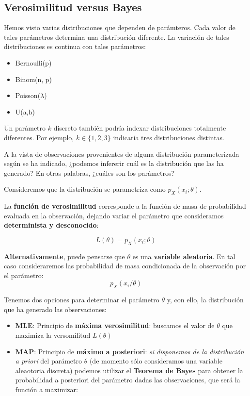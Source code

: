 \documentclass[11pt]{article}
\providecommand{\tightlist}{%
      \setlength{\itemsep}{0pt}\setlength{\parskip}{0pt}}
\begin{document}
    \hypertarget{verosimilitud-versus-bayes}{%
\subsection*{Verosimilitud versus
Bayes}\label{verosimilitud-versus-bayes}}

Hemos visto varias distribuciones que dependen de parámteros. Cada valor
de tales parámetros determina una distribución diferente. La variación
de tales distribuciones es continua con tales parámetros:

\begin{itemize}
\tightlist
\item
  Bernoulli(p)
\item
  Binom(n, p)
\item
  Poisson(\(\lambda\))
\item
  U(a,b)
\end{itemize}

Un parámetro \(k\) discreto también podría indexar distribuciones
totalmente diferentes. Por ejemplo, \(k \in \{1,2,3\}\) indicaría tres
distribuciones distintas.

    A la vista de observaciones provenientes de alguna distribución
parameterizada según se ha indicado, ¿podemos infererir cuál es la
distribución que las ha generado? En otras palabras, ¿cuáles son los
parámetros?

Consideremos que la distribución se parametriza como
\(p_X(x_i; \theta)\).

La \textbf{función de verosimilitud} corresponde a la función de masa de
probabilidad evaluada en la observación, dejando variar el parámetro que
consideramos \textbf{determinista y desconocido}:

\[L(\theta) = p_X(x_i; \theta)\]

\textbf{Alternativamente}, puede pensarse que \(\theta\) es una
\textbf{variable aleatoria}. En tal caso consideraremos las probabilidad
de masa condicionada de la observación por el parámetro:
\[p_X(x_i/\theta)\]

    Tenemos dos opciones para determinar el parámetro \(\theta\) y, con
ello, la distribución que ha generado las observaciones:

\begin{itemize}
\tightlist
\item
  \textbf{MLE}: Principio de \textbf{máxima verosimilitud}: buscamos el
  valor de \(\theta\) que maximiza la versomilitud \(L(\theta)\)
\item
  \textbf{MAP}: Principio de \textbf{máximo a posteriori}: \emph{si
  disponemos de la distribución a priori} del parámetro \(\theta\) (de
  momento sólo consideramos una variable aleaotoria discreta) podemos
  utilizar el \textbf{Teorema de Bayes} para obtener la probabilidad a
  posteriori del parámetro dadas las observaciones, que será la función
  a maximizar:
\end{itemize}
\end{document}
